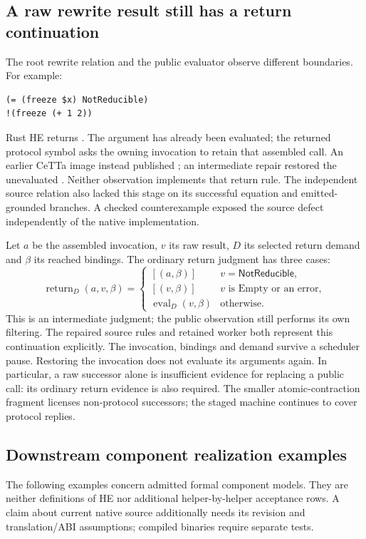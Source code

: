 \documentclass[11pt,a4paper]{article}
\newcommand{\code}[1]{\texttt{\detokenize{#1}}}
\begin{document}
\subsection*{A raw rewrite result still has a return continuation}

The root rewrite relation and the public evaluator observe different
boundaries. For example:
\begin{verbatim}
(= (freeze $x) NotReducible)
!(freeze (+ 1 2))
\end{verbatim}
Rust HE returns \code{(freeze 3)}. The argument has already been evaluated;
the returned protocol symbol asks the owning invocation to retain that
assembled call. An earlier CeTTa image instead published
\code{NotReducible}; an intermediate repair restored the unevaluated
\code{(freeze (+ 1 2))}. Neither observation implements that return rule.
The independent source relation also lacked this stage on its successful
equation and emitted-grounded branches. A checked counterexample exposed
the source defect independently of the native implementation.

Let $a$ be the assembled invocation, $v$ its raw result, $D$ its selected
return demand and $\beta$ its reached bindings. The ordinary return
judgment has three cases:
\[
 \operatorname{return}_{D}(a,v,\beta)=
 \begin{cases}
   [(a,\beta)] & v=\mathsf{NotReducible},\\
   [(v,\beta)] & v\text{ is Empty or an error},\\
   \operatorname{eval}_{D}(v,\beta) & \text{otherwise}.
 \end{cases}
\]
This is an intermediate judgment; the public observation still performs
its own filtering. The repaired source rules and retained worker both
represent this continuation explicitly. The invocation, bindings and
demand survive a scheduler pause. Restoring the invocation does not
evaluate its arguments again. In particular, a raw successor alone is
insufficient evidence for replacing a public call: its ordinary return
evidence is also required. The smaller atomic-contraction fragment licenses
non-protocol successors; the staged machine continues to cover protocol
replies.

\subsection*{Downstream component realization examples}

The following examples concern admitted formal component models. They are
neither definitions of HE nor additional helper-by-helper acceptance rows.
A claim about current native source additionally needs its revision and
translation/ABI assumptions; compiled binaries require separate tests.
\end{document}
